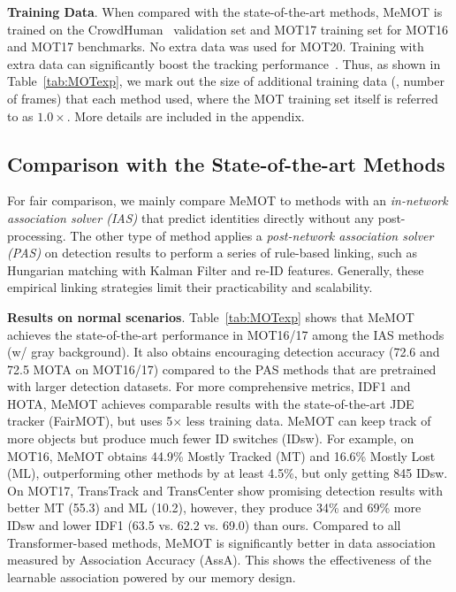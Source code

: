 \vspace{3pt} \noindent \textbf{Training Data}.
When compared with the state-of-the-art methods, MeMOT is trained on the CrowdHuman~\cite{shao2018crowdhuman} validation set and MOT17 training set for MOT16 and MOT17 benchmarks.
No extra data was used for MOT20.
Training with extra data can significantly boost the tracking performance~\cite{zhang2020fair}.
Thus, as shown in Table~\ref{tab:MOTexp}, we mark out the size of additional training data (\ie, number of frames) that each method used, where the MOT training set itself is referred to as $1.0\times$.
More details are included in the appendix.

\subsection{Comparison with the State-of-the-art Methods}
\label{sec:exp:sota}

For fair comparison, we mainly compare MeMOT to methods with an \textit{in-network association solver (IAS)} that predict identities directly without any post-processing. The other type of method applies a \textit{post-network association solver (PAS)} on detection results to perform a series of rule-based linking, such as Hungarian matching with Kalman Filter and re-ID features.
Generally, these empirical linking strategies limit their practicability and scalability.

\vspace{3pt} \noindent \textbf{Results on normal scenarios}.
Table~\ref{tab:MOTexp} shows that MeMOT achieves the state-of-the-art performance in MOT16/17 among the IAS methods (w/ gray background).
It also obtains encouraging detection accuracy (72.6 and 72.5 MOTA on MOT16/17) compared to the PAS methods that are pretrained with larger detection datasets.
For more comprehensive metrics, IDF1 and HOTA, MeMOT achieves comparable results with the state-of-the-art JDE tracker (FairMOT), but uses 5$\times$ less training data.
MeMOT can keep track of more objects but produce much fewer ID switches (IDsw).
For example, on MOT16, MeMOT obtains 44.9\% Mostly Tracked (MT) and 16.6\% Mostly Lost (ML), outperforming other methods by at least 4.5\%, but only getting 845 IDsw.
On MOT17, TransTrack and TransCenter show promising detection results with better MT (55.3) and ML (10.2), however, they produce 34\% and 69\% more IDsw and lower IDF1 (63.5 vs. 62.2 vs. 69.0) than ours.
Compared to all Transformer-based methods, MeMOT is significantly better in data association measured by Association Accuracy (AssA).
This shows the effectiveness of the learnable association powered by our memory design.

